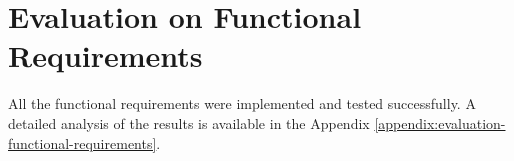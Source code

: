 \section{Evaluation on Functional Requirements}

All the functional requirements were implemented and tested successfully. A detailed analysis of the results is available in the Appendix \ref{appendix:evaluation-functional-requirements}.
